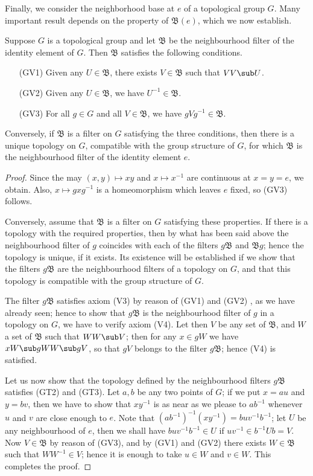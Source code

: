 Finally, we consider the neighborhood base at $e$ of a topological group $G$. Many important result depends on the property of $\mathfrak{B}(e)$, which we now establish.
\begin{proposition}\label{topological group nbhd filter iff}
Suppose $G$ is a topological group and let $\mathfrak{B}$ be the neighbourhood filter of the identity element of $G$. Then $\mathfrak{B}$ satisfies the following conditions.
\begin{enumerate}[leftmargin=40pt]
\item[(GV1)] Given any $U\in\mathfrak{B}$, there exists $V\in\mathfrak{B}$ such that $VV\sub U$.
\item[(GV2)] Given any $U\in\mathfrak{B}$, we have $U^{-1}\in\mathfrak{B}$.
\item[(GV3)] For all $g\in G$ and all $V\in\mathfrak{B}$, we have $gVg^{-1}\in\mathfrak{B}$.
\end{enumerate}
Conversely, if $\mathfrak{B}$ is a filter on $G$ satisfying the three conditions, then there is a unique topology on $G$, compatible with the group structure of $G$, for which $\mathfrak{B}$ is the neighbourhood filter of the identity element $e$.
\end{proposition}
\begin{proof}
Since the may $(x,y)\mapsto xy$ and $x\mapsto x^{-1}$ are continuous at $x=y=e$, we obtain. Also, $x\mapsto gxg^{-1}$ is a homeomorphism which leaves $e$ fixed, so (GV3) follows.\par
Conversely, assume that $\mathfrak{B}$ is a filter on $G$ satisfying these properties. If there is a topology with the required properties, then by what has been said above the neighbourhood filter of $g$ coincides with each of the filters $g\mathfrak{B}$ and $\mathfrak{B}g$; hence the topology is unique, if it exists. Its existence will be established if we show that the filters $g\mathfrak{B}$ are the neighbourhood filters of a topology on $G$, and that this topology is compatible with the group structure of $G$.\par
The filter $g\mathfrak{B}$ satisfies axiom (V3) by reason of (GV1) and (GV2) , as we have already seen; hence to show that $g\mathfrak{B}$ is the neighbourhood filter of $g$ in a topology on $G$, we have to verify axiom (V4). Let then $V$ be any set of $\mathfrak{B}$, and $W$ a set of $\mathfrak{B}$ such that $WW\sub V$; then for any $x\in gW$ we have $xW\sub g WW\sub gV$, so that $gV$ belongs to the filter $g\mathfrak{B}$; hence (V4) is satisfied.\par
Let us now show that the topology defined by the neighbourhood filters $g\mathfrak{B}$ satisfies (GT2) and (GT3). Let $a,b$ be any two points of $G$; if we put $x=au$ and $y=bv$, then we have to show that $xy^{-1}$ is as near as we please to $ab^{-1}$ whenever $u$ and $v$ are close enough to $e$. Note that $(ab^{-1})^{-1}(xy^{-1})=buv^{-1}b^{-1}$; let $U$ be any neighbourhood of $e$, then we shall have $buv^{-1}b^{-1}\in U$ if $uv^{-1}\in b^{-1}Ub=V$. Now $V\in\mathfrak{B}$ by reason of (GV3), and by (GV1) and (GV2) there exists $W\in\mathfrak{B}$ such that $WW^{-1}\in V$; hence it is enough to take $u\in W$ and $v\in W$. This completes the proof.
\end{proof}
